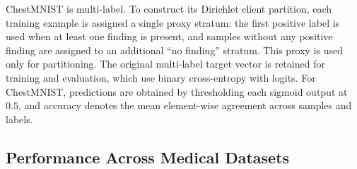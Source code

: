 \documentclass[twoside]{article}
\theoremstyle{thmstyleone}%
\theoremstyle{thmstyletwo}%
\theoremstyle{thmstylethree}%
\begin{document}
ChestMNIST is multi-label. To construct its Dirichlet client partition, each
training example is assigned a single proxy stratum: the first positive label
is used when at least one finding is present, and samples without any positive
finding are assigned to an additional ``no finding'' stratum. This proxy is
used only for partitioning. The original multi-label target vector is retained
for training and evaluation, which use binary cross-entropy with logits.
For ChestMNIST, predictions are obtained by thresholding each sigmoid output at
$0.5$, and accuracy denotes the mean element-wise agreement across samples and
labels.

\subsection{Performance Across Medical Datasets}
\end{document}
